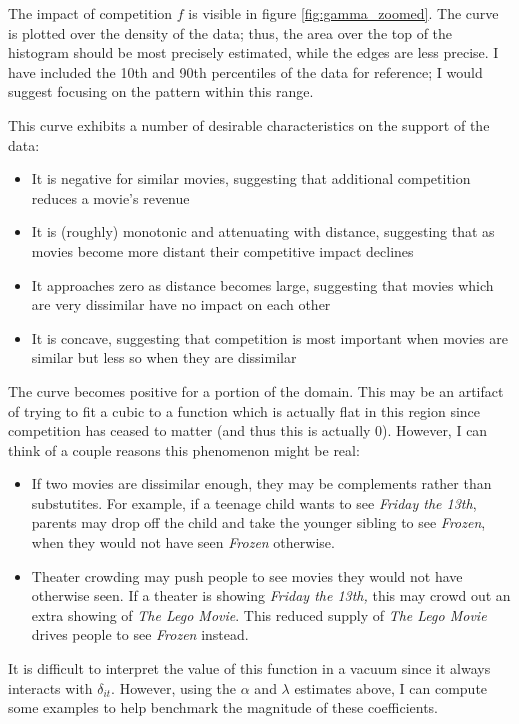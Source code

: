 \documentclass{article}
\begin{document}
The impact of competition $f$ is visible in figure \ref{fig:gamma_zoomed}. The curve is plotted over the density of the data; thus, the area over the top of the histogram should be most precisely estimated, while the edges are less precise. I have included the 10th and 90th percentiles of the data for reference; I would suggest focusing on the pattern within this range.

This curve exhibits a number of desirable characteristics on the support of the data:
\begin{itemize}
    \item It is negative for similar movies, suggesting that additional competition reduces a movie's revenue
    \item It is (roughly) monotonic and attenuating with distance, suggesting that as movies become more distant their competitive impact declines
    \item It approaches zero as distance becomes large, suggesting that movies which are very dissimilar have no impact on each other
    \item It is concave, suggesting that competition is most important when movies are similar but less so when they are dissimilar
\end{itemize}

The curve becomes positive for a portion of the domain. This may be an artifact of trying to fit a cubic to a function which is actually flat in this region since competition has ceased to matter (and thus this is actually 0). However, I can think of a couple reasons this phenomenon might be real:
\begin{itemize}
    \item If two movies are dissimilar enough, they may be complements rather than substutites. For example, if a teenage child wants to see \emph{Friday the 13th}, parents may drop off the child and take the younger sibling to see \emph{Frozen}, when they would not have seen \emph{Frozen} otherwise.
    \item Theater crowding may push people to see movies they would not have otherwise seen. If a theater is showing \emph{Friday the 13th,} this may crowd out an extra showing of \emph{The Lego Movie}. This reduced supply of \emph{The Lego Movie} drives people to see \emph{Frozen} instead.
\end{itemize}

It is difficult to interpret the value of this function in a vacuum since it always interacts with $\delta_{it}$. However, using the $\alpha$ and $\lambda$ estimates above, I can compute some examples to help benchmark the magnitude of these coefficients.
\end{document}
